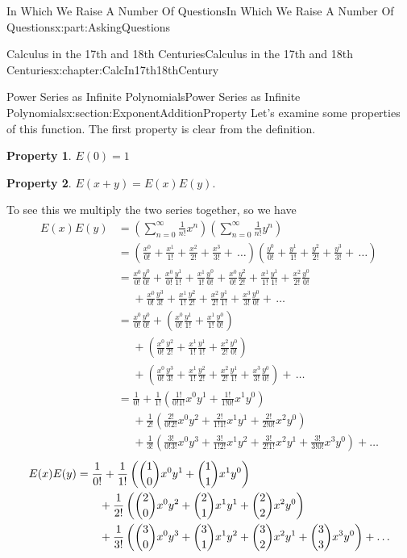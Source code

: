 \documentclass[oneside,10pt,]{book}
\newcommand{\terminology}[1]{\textbf{#1}}
\numberwithin{equation}{section}
\newcommand{\amp}{&}
\begin{document}
\begin{partptx}{In Which We Raise A Number Of Questions}{}{In Which We Raise A Number Of Questions}{}{}{x:part:AskingQuestions}
\begin{chapterptx}{Calculus in the 17th and 18th Centuries}{}{Calculus in the 17th and 18th Centuries}{}{}{x:chapter:CalcIn17th18thCentury}
\begin{sectionptx}{Power Series as Infinite Polynomials}{}{Power Series as Infinite Polynomials}{}{}{x:section:ExponentAdditionProperty}
Let's examine some properties of this function. The first property is clear from the definition.%
\par
{} \terminology{Property 1}. \(E(0)=1\)%
\par
{} \terminology{Property 2}. \(E(x+y)=E(x)E(y)\).%
\par
To see this we multiply the two series together, so we have%
\begin{align*}
E(x)E(y) \amp =\left(\sum_{n=0}^\infty\frac{1}{n!}x^n\right)\left(\sum_{n=0}^\infty\frac{1}{n!}y^n\right)\\
\amp =\left(\frac{x^0}{0!}+\frac{x^1}{1!}+\frac{x^2}{2!}+\frac{x^3}{3!}+\,\ldots\right)\left(\frac{y^0}{0!}+\frac{y^1}{1!}+\frac{y^2}{2!}+\frac{y^3}{3!}+\,\ldots\right)\\
\amp =\frac{x^0}{0!}\frac{y^0}{0!}+\frac{x^0}{0!}\frac{y^1}{1!}+\frac{x^1}{1!}\frac{y^0}{0!}+\frac{x^0}{0!}\frac{y^2}{2!}+\frac{x^1}{1!}\frac{y^1}{1!}+\frac{x^2}{2!}\frac{y^0}{0!}\\
\amp \ \ \ \ \ \  +\frac{x^0}{0!}\frac{y^3}{3!}+\frac{x^1}{1!}\frac{y^2}{2!}+\frac{x^2}{2!}\frac{y^1}{1!}+\frac{x^3}{3!}\frac{y^0}{0!}+\,\ldots\\
\amp =\frac{x^0}{0!}\frac{y^0}{0!}+\left(\frac{x^0}{0!}\frac{y^1}{1!}+ \frac{x^1}{1!}\frac{y^0}{0!}\right)\\
\amp \ \ \ \ \ \  +\left(\frac{x^0}{0!}\frac{y^2}{2!}+\frac{x^1}{1!}\frac{y^1}{1!}+\frac{x^2}{2!}\frac{y^0}{0!}\right)\\
\amp \ \ \ \ \ \ +\left(\frac{x^0}{0!}\frac{y^3}{3!}+\frac{x^1}{1!}\frac{y^2}{2!}+\frac{x^2}{2!}\frac{y^1}{1!}+\frac{x^3}{3!}\frac{y^0}{0!}\right)+\,\ldots\\
\amp =\frac{1}{0!}+\frac{1}{1!}\left(\frac{1!}{0!1!}x^0y^1+\frac{1!}{1!0!}x^1y^0\right)\\
\amp \ \ \ \ \ \ +\frac{1}{2!}\left(\frac{2!}{0!2!}x^0y^2+\frac{2!}{1!1!}x^1y^1+\frac{2!}{2!0!}x^2y^0\right)\\
\amp \ \ \ \ \ \ +\frac{1}{3!}\left(\frac{3!}{0!3!}x^0y^3+\frac{3!}{1!2!}x^1y^2+\frac{3!}{2!1!}x^2y^1+\frac{3!}{3!0!}x^3y^0\right)+\ldots
\end{align*}
%
\begin{align}
E(x)E(y) \amp =\frac{1}{0!}+\frac{1}{1!}\left(\binom{1}{0}x^0y^1+\binom{1}{1}x^1y^0\right)\notag\\
\amp \ \ \ \ \ \ +\frac{1}{2!}\left(\binom{2}{0}x^0y^2+\binom{2}{1}x^1y^1+\binom{2}{2}x^2y^0\right)\notag\\
\amp \ \ \ \ \ \ +\frac{1}{3!}\left(\binom{3}{0}x^0y^3+\binom{3}{1}x^1y^2+\binom{3}{2}x^2y^1+\binom{3}{3}x^3y^0\right)+\ldots\notag\\

\end{align}
\end{sectionptx}
\end{chapterptx}
\end{partptx}
\end{document}
